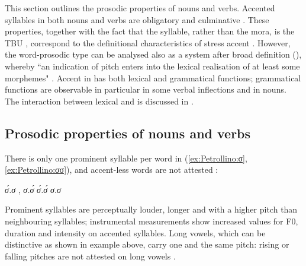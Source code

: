 \documentclass[output=paper]{LSP/langsci}
\begin{document}
This section outlines the prosodic properties of  nouns and verbs. Accented syllables in both nouns and verbs are obligatory and culminative . These properties, together with the fact that the syllable, rather than the mora, is the TBU , correspond to the definitional characteristics of stress accent \citep[231]{Hyman2006}. However, the  word-prosodic type can be analysed also as a  system after  broad definition (\citeyear{Hyman2001}), whereby “an indication of pitch enters into the lexical realisation of at least some morphemes" \citep[1367]{Hyman2001}. Accent in  has both lexical and grammatical functions; grammatical functions are observable in particular in some verbal inflections and in  nouns. The interaction between lexical and  is discussed in . 

\subsection{Prosodic properties of nouns and verbs} \label{sec:Petrollino:stress}   

There is only one prominent syllable per word in  (\ref{ex:Petrollino:σ}, \ref{ex:Petrollino:σσ}), and accent-less words are not attested :

\begin{exe}
\ex  \begin{xlist} \label{ex:Petrollino:obligatorinessculminativity}
\ex  \textit{σ́.σ}  ,  \textit{σ.σ́} \label{ex:Petrollino:σ}
\ex *\textit{σ́.σ́}  \label{ex:Petrollino:σσ}
\ex *\textit{σ.σ} \label{ex:Petrollino:σσσ}
\end{xlist}
\end{exe}

Prominent syllables are perceptually louder, longer and with a higher pitch than neighbouring syllables; instrumental measurements show increased values for F0, duration and intensity on accented syllables. Long vowels, which can be distinctive as shown in example  above, carry one and the same pitch: rising or falling pitches are not attested on long vowels .
\end{document}
